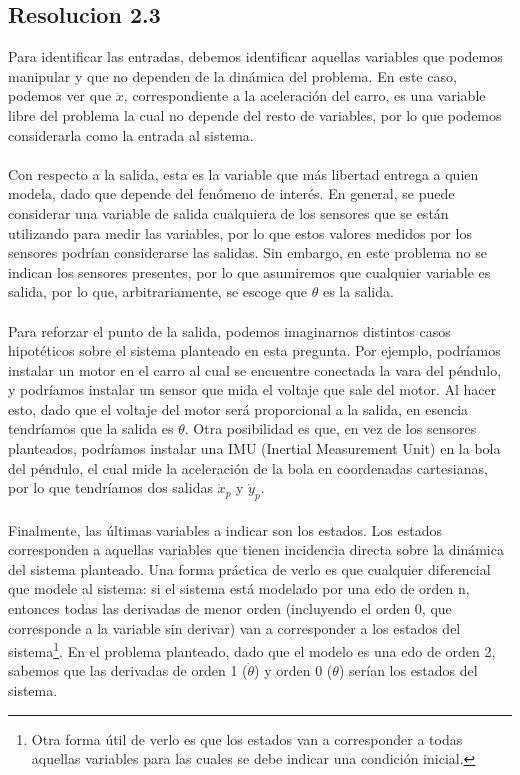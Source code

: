 \documentclass[
  11pt,
  letterpaper,
   addpoints,
   answers
  ]{exam}
\begin{document}
\begin{questions}
\begin{solution}
\subsection*{Resolucion 2.3}
Para identificar las entradas, debemos identificar aquellas variables que podemos manipular y que no dependen de la dinámica del problema. En este caso, podemos ver que \(\ddot{x}\), correspondiente a la aceleración del carro, es una variable libre del problema la cual no depende del resto de variables, por lo que podemos considerarla como la entrada al sistema.\\\\
Con respecto a la salida, esta es la variable que más libertad entrega a quien modela, dado que depende del fenómeno de interés. En general, se puede considerar una variable de salida cualquiera de los sensores que se están utilizando para medir las variables, por lo que estos valores medidos por los sensores podrían considerarse las salidas. Sin embargo, en este problema no se indican los sensores presentes, por lo que asumiremos que cualquier variable es salida, por lo que, arbitrariamente, se escoge que \(\theta\) es la salida.\\\\
Para reforzar el punto de la salida, podemos imaginarnos distintos casos hipotéticos sobre el sistema planteado en esta pregunta. Por ejemplo, podríamos instalar un motor en el carro al cual se encuentre conectada la vara del péndulo, y podríamos instalar un sensor que mida el voltaje que sale del motor. Al hacer esto, dado que el voltaje del motor será proporcional a la salida, en esencia tendríamos que la salida es \(\theta\). Otra posibilidad es que, en vez de los sensores planteados, podríamos instalar una IMU (Inertial Measurement Unit) en la bola del péndulo, el cual mide la aceleración de la bola en coordenadas cartesianas, por lo que tendríamos dos salidas \(\dot{x}_p\) y \(\dot{y}_p\).\\\\
Finalmente, las últimas variables a indicar son los estados. Los estados corresponden a aquellas variables que tienen incidencia directa sobre la dinámica del sistema planteado. Una forma práctica de verlo es que cualquier diferencial que modele al sistema: si el sistema está modelado por una edo de orden n, entonces todas las derivadas de menor orden (incluyendo el orden 0, que corresponde a la variable sin derivar) van a corresponder a los estados del sistema\footnote{Otra forma útil de verlo es que los estados van a corresponder a todas aquellas variables para las cuales se debe indicar una condición inicial.}. En el problema planteado, dado que el modelo es una edo de orden 2, sabemos que las derivadas de orden 1 (\(\dot{\theta}\)) y orden 0 (\(\theta\)) serían los estados del sistema.

\end{solution}
\end{questions}
\end{document}
